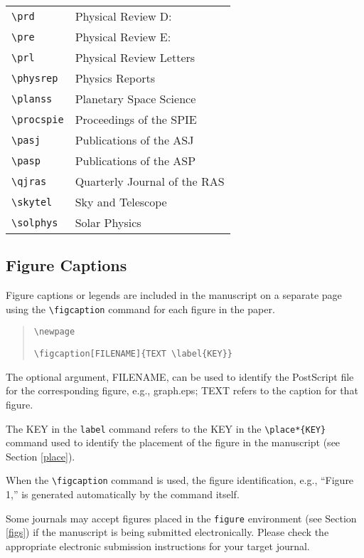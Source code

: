 \begin{center}
\begin{tabular}{ll}
\verb"\prd" & Physical Review D:\\
\verb"\pre" & Physical Review E:\\
\verb"\prl" & Physical Review Letters\\
\verb"\physrep" & Physics Reports\\
\verb"\planss" & Planetary Space Science\\
\verb"\procspie" & Proceedings of the SPIE\\
\verb"\pasj" & Publications of the ASJ\\
\verb"\pasp" & Publications of the ASP\\
\verb"\qjras" & Quarterly Journal of the RAS\\
\verb"\skytel" & Sky and Telescope\\
\verb"\solphys" & Solar Physics\\
\end{tabular}
\end{center}

\subsection{Figure Captions}      \label{legends}

Figure captions or legends are included in the manuscript on a 
separate page using the \verb"\figcaption" command for each figure in the 
paper.

\begin{quote}
\verb"\newpage"

\verb"\figcaption[FILENAME]{TEXT \label{KEY}}"
\end{quote}

The optional argument, {\small FILENAME}, can be used to identify
the PostScript file for the corresponding figure, e.g., graph.eps; 
{\small TEXT} refers to the caption for that figure. 

The {\small KEY} in the {\tt label} command refers to the {\small KEY} in the
\verb"\place*{KEY}" command used to identify the placement of the figure in the 
manuscript (see Section \ref{place}).

When the \verb"\figcaption" command is used, the figure 
identification,
e.g., ``Figure 1,'' is generated automatically by the command itself.

Some journals may accept figures placed in the {\tt figure} environment
(see Section \ref{figs}) if the manuscript is being submitted electronically. 
Please check the appropriate electronic submission instructions
for your target journal.

